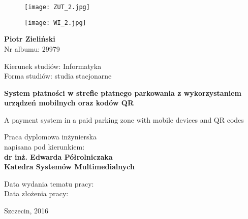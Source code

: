 \begin{titlepage}
	\begin{figure}[!htb]
		\begin{minipage}{0.48\textwidth}
			\raggedright
			\texttt{[image: ZUT\_2.jpg]}
		\end{minipage}\hfill
		\begin{minipage}{0.48\textwidth}
			\raggedleft
			\texttt{[image: WI\_2.jpg]}
		\end{minipage}
	\end{figure}
	\vspace{2cm}
	\begin{center}
		\textbf{Piotr Zieliński}\\
		Nr albumu: 29979
	\end{center}
	\begin{center}
		Kierunek studiów: Informatyka\\
		Forma studiów: studia stacjonarne
	\end{center}
	\vspace{1.5cm}
	\begin{center}
		\textbf{\LARGE System płatności w strefie płatnego parkowania z wykorzystaniem urządzeń mobilnych oraz kodów QR}
	\end{center}
	\begin{center}
		{\large A payment system in a paid parking zone with mobile devices and QR codes}
	\end{center}
	\begin{center}
		Praca dyplomowa inżynierska\\
		napisana pod kierunkiem:\\
		\textbf{dr inż. Edwarda Półrolniczaka\\
			Katedra Systemów Multimedialnych}
	\end{center}
	\vspace{.5cm}
	Data wydania tematu pracy:\\
	Data złożenia pracy:
	
	\begin{center}
		Szczecin, 2016
	\end{center}

\end{titlepage}